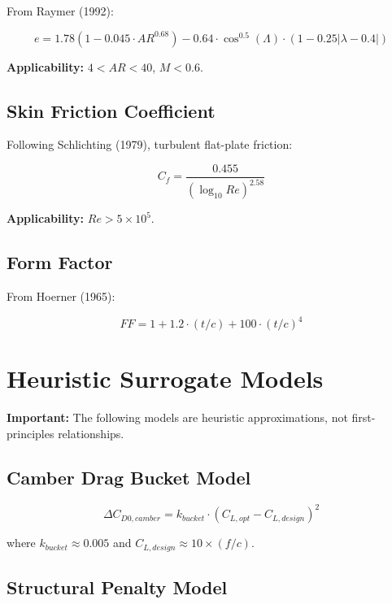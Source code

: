 \documentclass[11pt,a4paper]{article}
\begin{document}
From Raymer (1992):

\begin{equation}
e = 1.78(1 - 0.045 \cdot AR^{0.68}) - 0.64 \cdot \cos^{0.5}(\Lambda) \cdot (1 - 0.25|\lambda - 0.4|)
\end{equation}

\textbf{Applicability:} $4 < AR < 40$, $M < 0.6$.

\subsection{Skin Friction Coefficient}

Following Schlichting (1979), turbulent flat-plate friction:

\begin{equation}
C_f = \frac{0.455}{(\log_{10} Re)^{2.58}}
\end{equation}

\textbf{Applicability:} $Re > 5 \times 10^5$.

\subsection{Form Factor}

From Hoerner (1965):

\begin{equation}
FF = 1 + 1.2 \cdot (t/c) + 100 \cdot (t/c)^4
\end{equation}

\section{Heuristic Surrogate Models}

\textbf{Important:} The following models are heuristic approximations, not first-principles relationships.

\subsection{Camber Drag Bucket Model}

\begin{equation}
\Delta C_{D0,camber} = k_{bucket} \cdot (C_{L,opt} - C_{L,design})^2
\end{equation}

where $k_{bucket} \approx 0.005$ and $C_{L,design} \approx 10 \times (f/c)$.

\subsection{Structural Penalty Model}
\end{document}
